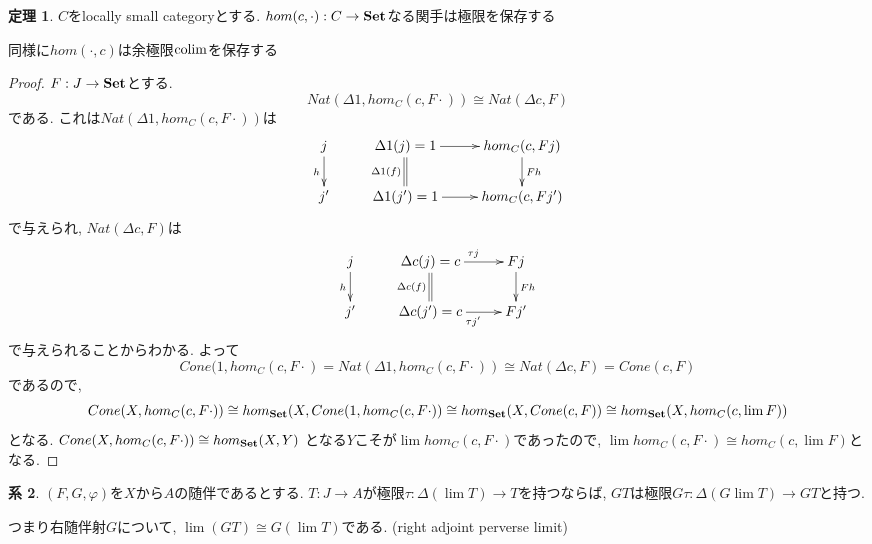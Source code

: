 \documentclass[dvipdfmx,a4paper,11pt]{article}
\newcommand{\colim}{{\rm colim}}
\theoremstyle{definition}
\newtheorem{thm}{定理}
\newtheorem{cor}[thm]{系}
\begin{document}
 \begin{tcolorbox}
 [colback = white, colframe = green!35!black, fonttitle = \bfseries,breakable = true]
\begin{thm}
$C$をlocally small categoryとする. 
$hom (c , \cdot ) : C \to {\bf Set}$なる関手は極限を保存する
\end{thm}
\end{tcolorbox}
同様に$hom ( \cdot, c)$は余極限$\colim$を保存する
\begin{proof}
$F: J \to {\bf Set}$とする. 
$$
Nat(\Delta  1, hom_{C}(c, F\cdot))
\cong
Nat(\Delta c, F)
$$
である.
これは$Nat(\Delta  1, hom_{C}(c, F\cdot))$は
\begin{equation*}
\xymatrix@C=25pt@R=20pt{
j\ar@{->}[d]_{h}&\Delta 1(j)=1\ar@{=}[d]_{\Delta 1(f)}  \ar@{->}[r] & hom_{C}(c, Fj)\ar@{->}[d]^{Fh} \\
j'&\Delta 1(j')=1\ar@{->}[r]  &  hom_{C}(c, Fj')\\   
}
\end{equation*}
で与えられ, $Nat(\Delta c, F)$は
\begin{equation*}
\xymatrix@C=25pt@R=20pt{
j\ar@{->}[d]_{h}&\Delta c(j)=c\ar@{=}[d]_{\Delta c(f)}  \ar@{->}[r]^{\tau j} & Fj\ar@{->}[d]^{Fh} \\
j'&\Delta c(j')=c\ar@{->}[r]_{\tau j'} & Fj'\\   
}
\end{equation*}
で与えられることからわかる. 
よって
$$
Cone(1, hom_{C}(c, F\cdot)
=
Nat(\Delta  1, hom_{C}(c, F\cdot))
\cong
Nat(\Delta c, F)
=
Cone(c,F)
$$
であるので,
$$
Cone(X,hom_{C}(c, F\cdot)) \cong
hom_{{\bf Set}} (X, Cone(1, hom_{C}(c, F\cdot))\cong 
hom_{{\bf Set}} (X, Cone(c,F)) \cong
hom_{{\bf Set}} (X, hom_{C}(c, \lim F))
$$
となる.
$Cone(X,hom_{C}(c, F\cdot)) \cong hom_{{\bf Set}} (X, Y)$
となる$Y$こそが$\lim hom_{C}(c, F \cdot)$であったので, 
$\lim hom_{C}(c, F\cdot) \cong hom_{C}(c, \lim F)$となる. 
\end{proof}

 \begin{tcolorbox}
 [colback = white, colframe = green!35!black, fonttitle = \bfseries,breakable = true]
\begin{cor}
$(F,G,\varphi)$を$X$から$A$の随伴であるとする. 
$T : J \to A$が極限$\tau : \Delta (\lim T) \to T$を持つならば, 
$GT$は極限$G\tau : \Delta (G \lim T) \to GT$と持つ.

つまり右随伴射$G$について, $\lim (GT) \cong G(\lim T)$である.
(right adjoint perverse limit)
\end{cor}
\end{tcolorbox}
\end{document}
